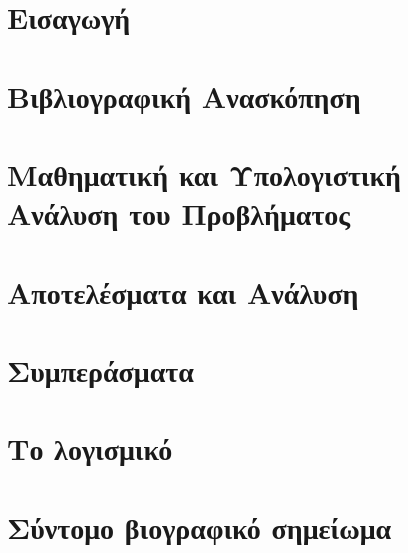 \documentclass[12pt]{report}
\begin{document}











\tableofcontents



\listoffigures

\chapter{Εισαγωγή}


\chapter{Βιβλιογραφική Ανασκόπηση}


\chapter{Μαθηματική και Υπολογιστική Ανάλυση του Προβλήματος}


\chapter{Αποτελέσματα και Ανάλυση}


\chapter{Συμπεράσματα}




\appendix
\chapter{Το λογισμικό}

\chapter{Σύντομο βιογραφικό σημείωμα}

\end{document}

